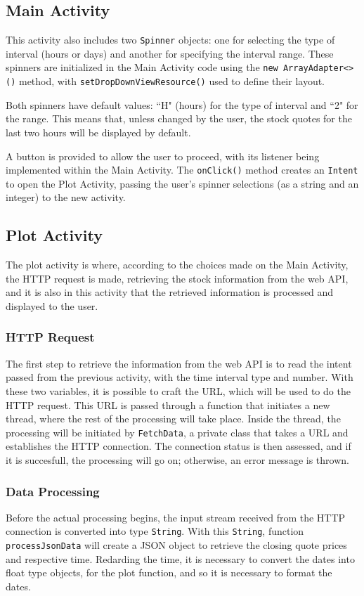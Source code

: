 \documentclass{article}
\begin{document}
\subsection{Main Activity}
\label{sec:Main Activity Java}
This activity also includes two \texttt{Spinner} objects: one for selecting the type of interval (hours or days) and another for specifying the interval range. 
These spinners are initialized in the Main Activity code using the \texttt{new ArrayAdapter<>()} method, with \texttt{setDropDownViewResource()} used to define their layout.

Both spinners have default values: ``H" (hours) for the type of interval and ``2" for the range. 
This means that, unless changed by the user, the stock quotes for the last two hours will be displayed by default.

A button is provided to allow the user to proceed, with its listener being implemented within the Main Activity. The \texttt{onClick()} method creates an \texttt{Intent} to open the Plot Activity, passing the user's spinner selections (as a string and an integer) to the new activity.


\subsection{Plot Activity}
The plot activity is where, according to the choices made on the Main Activity, the HTTP request is made, retrieving the stock information from the web API, and it is also in this activity that the retrieved information is processed and displayed to the user.

\subsubsection{HTTP Request}
The first step to retrieve the information from the web API is to read the intent passed from the previous activity, with the time interval type and number.
With these two variables, it is possible to craft the URL, which will be used to do the HTTP request.
This URL is passed through a function that initiates a new thread, where the rest of the processing will take place.
Inside the thread, the processing will be initiated by \texttt{FetchData}, a private class that takes a URL and establishes the HTTP connection.
The connection status is then assessed, and if it is succesfull, the processing will go on; otherwise, an error message is thrown.

\subsubsection{Data Processing}
Before the actual processing begins, the input stream received from the HTTP connection is converted into type \texttt{String}.
With this \texttt{String}, function \texttt{processJsonData} will create a JSON object to retrieve the closing quote prices and respective time.
Redarding the time, it is necessary to convert the dates into float type objects, for the plot function, and so it is necessary to format the dates.
\end{document}
